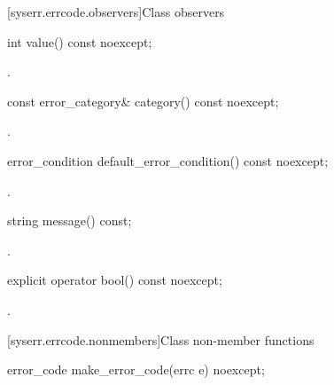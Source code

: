 [syserr.errcode.observers]{Class  observers}

%
\begin{itemdecl}
int value() const noexcept;
\end{itemdecl}

\begin{itemdescr}
\pnum
\returns {}.
\end{itemdescr}

%
\begin{itemdecl}
const error_category& category() const noexcept;
\end{itemdecl}

\begin{itemdescr}
\pnum
\returns {}.
\end{itemdescr}

%
\begin{itemdecl}
error_condition default_error_condition() const noexcept;
\end{itemdecl}

\begin{itemdescr}
\pnum
\returns {}.
\end{itemdescr}

%
\begin{itemdecl}
string message() const;
\end{itemdecl}

\begin{itemdescr}
\pnum
\returns {}.
\end{itemdescr}

%
\begin{itemdecl}
explicit operator bool() const noexcept;
\end{itemdecl}

\begin{itemdescr}
\pnum
\returns {}.
\end{itemdescr}

[syserr.errcode.nonmembers]{Class  non-member functions}

%
\begin{itemdecl}
error_code make_error_code(errc e) noexcept;
\end{itemdecl}


